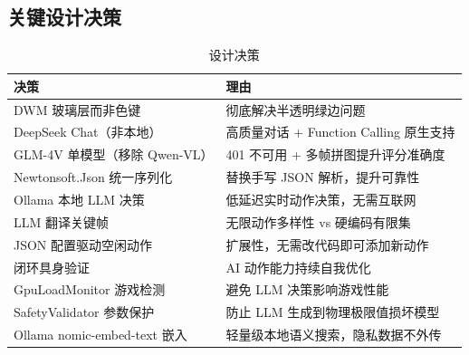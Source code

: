 \documentclass[12pt,a4paper]{ctexart}
\begin{document}
\subsection{关键设计决策}

\begin{table}[H]
\centering
\caption{设计决策}
\label{tab:decisions}
\begin{tabular}{lp{8cm}}
\toprule
\textbf{决策} & \textbf{理由} \\
\midrule
DWM 玻璃层而非色键 & 彻底解决半透明绿边问题 \\
DeepSeek Chat（非本地） & 高质量对话 + Function Calling 原生支持 \\
GLM-4V 单模型（移除 Qwen-VL） & 401 不可用 + 多帧拼图提升评分准确度 \\
Newtonsoft.Json 统一序列化 & 替换手写 JSON 解析，提升可靠性 \\
Ollama 本地 LLM 决策 & 低延迟实时动作决策，无需互联网 \\
LLM 翻译关键帧 & 无限动作多样性 vs 硬编码有限集 \\
JSON 配置驱动空闲动作 & 扩展性，无需改代码即可添加新动作 \\
闭环具身验证 & AI 动作能力持续自我优化 \\
GpuLoadMonitor 游戏检测 & 避免 LLM 决策影响游戏性能 \\
SafetyValidator 参数保护 & 防止 LLM 生成到物理极限值损坏模型 \\
Ollama nomic-embed-text 嵌入 & 轻量级本地语义搜索，隐私数据不外传 \\
\bottomrule
\end{tabular}
\end{table}
\end{document}
